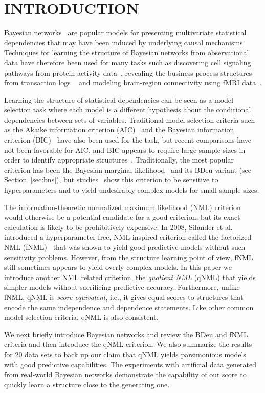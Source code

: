\section{INTRODUCTION}
\label{sec:intro}
Bayesian networks~\cite{Pear88} are popular models for presenting
multivariate statistical dependencies that may have been induced by
underlying causal mechanisms.  Techniques for learning the structure
of Bayesian networks from observational data have therefore been used
for many tasks such as discovering cell signaling pathways from
protein activity data~\cite{bn4sigpath02}, revealing the business
process structures from transaction logs ~\cite{bn4bpmining} and
modeling brain-region connectivity using fMRI
data~\cite{bn4brainconnect}.

Learning the structure of statistical dependencies can be seen as a
model selection task where each model is a different hypothesis about
the conditional dependencies between sets of variables. Traditional
model selection criteria such as the Akaike information criterion
(AIC)~\cite{Akai73} and the Bayesian information criterion
(BIC)~\cite{Schw78} have also been used for the task, but recent
comparisons have not been favorable for AIC, and BIC appears to
require large sample sizes in order to identify appropriate
structures~\cite{cosco.pgm08a,Liu2012}. Traditionally, the most
popular criterion has been the Bayesian marginal
likelihood~\cite{Heck95b} and its BDeu variant (see
Section~\ref{sec:bns}), but studies~\cite{cosco.uai07,Steck08} show
this criterion to be sensitive to hyperparameters and to
yield undesirably complex models for small sample sizes.

The information-theoretic normalized maximum likelihood (NML)
criterion~\cite{Shta87,Riss96a} would otherwise be a potential
candidate for a good criterion, but its exact calculation is likely to
be prohibitively expensive. In 2008, Silander et al. introduced a
hyperparameter-free, NML inspired criterion called the factorized NML
(fNML)~\cite{cosco.pgm08a} that was shown to yield good predictive
models without such sensitivity problems. However, from the structure
learning point of view, fNML still sometimes appears to yield
overly complex models. In this paper we introduce another NML related
criterion, the \textit{quotient NML} (qNML) that yields simpler models
without sacrificing predictive accuracy. Furthermore, unlike fNML,
qNML is \textit{score equivalent}, i.e., it gives equal scores to
structures that encode the same independence and dependence
statements. Like other common model selection criteria, qNML is also
consistent.

We next briefly introduce Bayesian networks and review the BDeu and
fNML criteria and then introduce the qNML criterion.  We also
summarize the results for 20 data sets to back up our claim that qNML
yields parsimonious models with good predictive capabilities. The
experiments with artificial data generated from real-world Bayesian networks demonstrate the capability of our score to quickly learn a structure close to the generating one.

